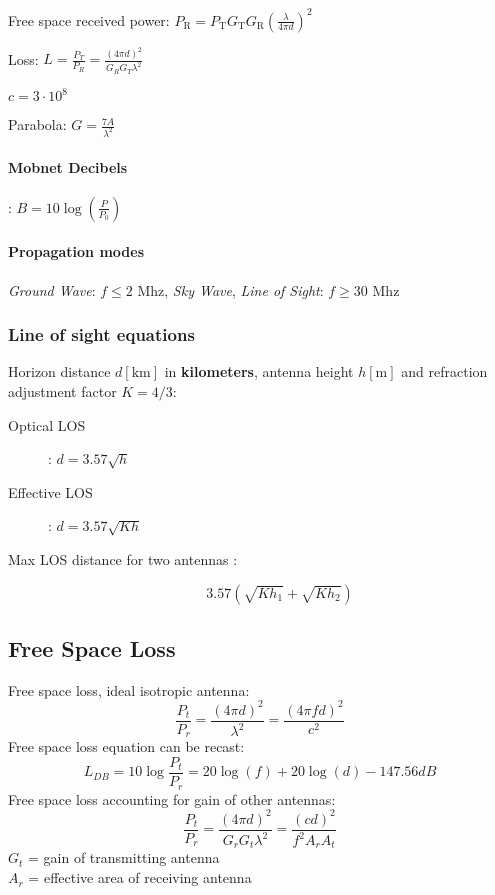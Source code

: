 \documentclass[6pt]{scrartcl}
\begin{document}
\begin{multicols}{4}
Free space received power: $P_\textrm{R} =  P_\textrm{T}G_\textrm{T}G_\textrm{R}(\frac{\lambda}{4\pi d})^2$

Loss: $L = \frac{P_T}{P_R} = \frac{(4\pi d)^2}{G_RG_T\lambda^2} $

$ c = 3 \cdot 10^8 $

Parabola: $G = \frac{7A}{\lambda^2}$

\paragraph{Mobnet Decibels}:
$B = 10\log(\frac{P}{P_0})$

\paragraph{Propagation modes}
\emph{Ground Wave}: $f \le 2$ Mhz, \emph{Sky Wave}, \emph{Line of Sight}: $f \ge 30$ Mhz

\subsubsection{Line of sight equations}
Horizon distance $d[\textrm{km}]$ in \textbf{kilometers}, antenna height $h[\textrm{m}]$ and refraction adjustment factor $K = 4/3$:
\begin{description}
\item[Optical LOS]: $d = 3.57\sqrt{h}$
\item[Effective LOS]: $d = 3.57\sqrt{Kh}$
\item[Max LOS distance for two antennas :] $$3.57(\sqrt{Kh_1}+ \sqrt{Kh_2})$$
\end{description}


\subsection{Free Space Loss}

Free space loss, ideal isotropic antenna:
$$ \frac{P_t}{P_r} = \frac{(4\pi d)^2}{\lambda^2} = \frac{(4\pi fd)^2}{c^2} $$
Free space loss equation can be recast:
$$L_{DB} = 10\log \frac{P_t}{P_r} = 20 \log(f) +20\log(d) - 147.56 dB$$
Free space loss accounting for gain of other antennas: 
$$\frac{P_t}{P_r} = \frac{(4\pi d)^2}{G_rG_t\lambda^2} = \frac{(cd)^2}{f^2A_rA_t}$$
$G_t$ = gain of transmitting antenna\\
$A_r$ = effective area of receiving antenna




\end{multicols}
\end{document}
